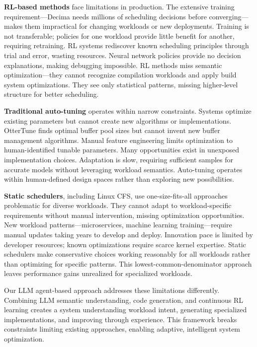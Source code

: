 \textbf{RL-based methods} face limitations in production. The extensive training requirement—Decima needs millions of scheduling decisions before converging—makes them impractical for changing workloads or new deployments. Training is not transferable; policies for one workload provide little benefit for another, requiring retraining. RL systems rediscover known scheduling principles through trial and error, wasting resources. Neural network policies provide no decision explanations, making debugging impossible. RL methods miss semantic optimization—they cannot recognize compilation workloads and apply build system optimizations. They see only statistical patterns, missing higher-level structure for better scheduling.

\textbf{Traditional auto-tuning} operates within narrow constraints. Systems optimize existing parameters but cannot create new algorithms or implementations. OtterTune finds optimal buffer pool sizes but cannot invent new buffer management algorithms. Manual feature engineering limits optimization to human-identified tunable parameters. Many opportunities exist in unexposed implementation choices. Adaptation is slow, requiring sufficient samples for accurate models without leveraging workload semantics. Auto-tuning operates within human-defined design spaces rather than exploring new possibilities.

\textbf{Static schedulers}, including Linux CFS, use one-size-fits-all approaches problematic for diverse workloads. They cannot adapt to workload-specific requirements without manual intervention, missing optimization opportunities. New workload patterns—microservices, machine learning training—require manual updates taking years to develop and deploy. Innovation pace is limited by developer resources; known optimizations require scarce kernel expertise. Static schedulers make conservative choices working reasonably for all workloads rather than optimizing for specific patterns. This lowest-common-denominator approach leaves performance gains unrealized for specialized workloads.

Our LLM agent-based approach addresses these limitations differently. Combining LLM semantic understanding, code generation, and continuous RL learning creates a system understanding workload intent, generating specialized implementations, and improving through experience. This framework breaks constraints limiting existing approaches, enabling adaptive, intelligent system optimization.